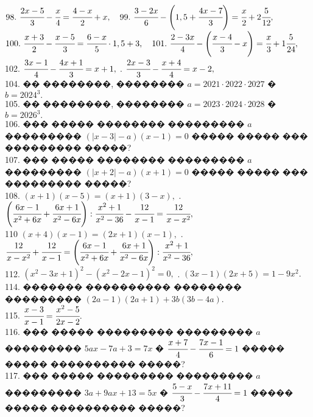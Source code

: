 \documentclass[12pt]{article}
\begin{document}
$98.\ \cfrac{2x-5}{3}-\cfrac{x}{4}=\cfrac{4-x}{2}+x, \quad 99.\ \cfrac{3-2x}{6}-\left(1,5+\cfrac{4x-7}{3}\right)=\cfrac{x}{2}+2\cfrac{5}{12},$\\
$100.\ \cfrac{x+3}{2}-\cfrac{x-5}{3}=\cfrac{6-x}{5}\cdot1,5+3, \quad 101.\ \cfrac{2-3x}{4}-\left(\cfrac{x-4}{3}-x\right)=\cfrac{x}{3}+1\cfrac{5}{24},$\\
102. $\cfrac{3x-1}{4}-\cfrac{4x+1}{3}=x+1,$ . $\cfrac{2x-3}{3}-\cfrac{x+4}{4}=x-2,$\\
104. �� ��������, �������� $a=2021\cdot2022\cdot2027$ � $b=2024^3.$\\
105. �� ��������, �������� $a=2023\cdot2024\cdot2028$ � $b=2026^3.$\\
106. ��� ����� �������� ��������� $a$ ��������� $(|x-3|-a)(x-1)=0$ ����� ����� ��� ��������� �����?\\
107. ��� ����� �������� ��������� $a$ ��������� $(|x+2|-a)(x+1)=0$ ����� ����� ��� ��������� �����?\\
108. $(x+1)(x-5)=(x+1)(3-x),$ . $\left(\cfrac{6x-1}{x^2+6x}+\cfrac{6x+1}{x^2-6x}\right):\cfrac{x^2+1}{x^2-36}-\cfrac{12}{x-1}=\cfrac{12}{x-x^2},$\\
110 $(x+4)(x-1)=(2x+1)(x-1),$ . $\cfrac{12}{x-x^2}+\cfrac{12}{x-1}=\left(\cfrac{6x-1}{x^2+6x}+\cfrac{6x+1}{x^2-6x}\right):\cfrac{x^2+1}{x^2-36},$\\
112. $(x^2-3x+1)^2-(x^2-2x-1)^2=0,$ . $(3x-1)(2x+5)=1-9x^2.$\\
114. ������� ���������� �������� ��������� $(2a-1)(2a+1)+3b(3b-4a).$\\
115. $\cfrac{x-3}{x-1}=\cfrac{x^2-5}{2x-2}.$\\
116. ��� ����� ��������� ��������� $a$ ��������� $5ax - 7a + 3 = 7x$ � $\cfrac{x+7}{4}-\cfrac{7x-1}{6}=1$ ����� ����� ���������� �����?\\
117. ��� ����� ��������� ��������� $a$ ��������� $3a + 9ax + 13 = 5x$ � $\cfrac{5-x}{3}-\cfrac{7x+11}{4}=1$ ����� ����� ���������� �����?
\newpage
\end{document}
